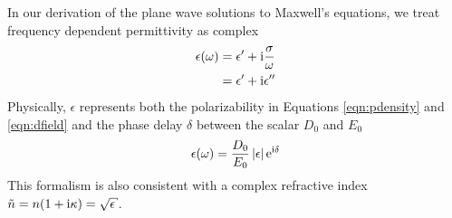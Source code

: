 In our derivation of the plane wave solutions to Maxwell's equations, we
treat frequency dependent permittivity as complex
\begin{align}
 \epsilon(\omega) &= \epsilon^\prime + {\mathrm{i}} \frac{\sigma}{\omega}\\
                   &= \epsilon^\prime + {\mathrm{i}}\epsilon^{\prime\prime}
\end{align}
Physically, $\epsilon$ represents
both the polarizability in Equations \ref{eqn:pdensity} and
\ref{eqn:dfield} and the phase delay $\delta$ between the scalar $D_0$ and
$E_0$
\begin{equation}
 \epsilon(\omega) = \frac{D_0}{E_0} \,|\epsilon| \,{\mathrm{e}}^{{\mathrm{i}} \delta}
\end{equation}
This formalism is also consistent with a complex
refractive index $\tilde{n} = n(1+\mi \kappa) = \sqrt{\epsilon}$.

